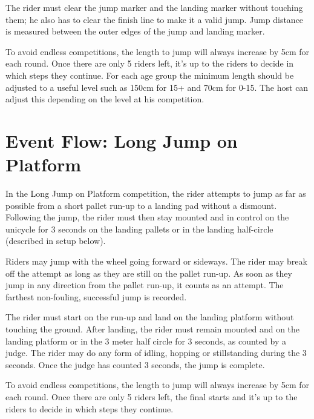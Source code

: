 The rider must clear the jump marker and the landing marker without touching them; he also has to clear the finish line to make it a valid jump.
Jump distance is measured between the outer edges of the jump and landing marker.

To avoid endless competitions, the length to jump will always increase by 5cm for each round.
Once there are only 5 riders left, it's up to the riders to decide in which steps they continue.
For each age group the minimum length should be adjusted to a useful level such as 150cm for 15+ and 70cm for 0-15.
The host can adjust this depending on the level at his competition.

\section{Event Flow: Long Jump on Platform}
In the Long Jump on Platform competition, the rider attempts to jump as far as possible from a short pallet run-up to a landing pad without a dismount.
Following the jump, the rider must then stay mounted and in control on the unicycle for 3 seconds on the landing pallets or in the landing half-circle (described in setup below).

Riders may jump with the wheel going forward or sideways.
The rider may break off the attempt as long as they are still on the pallet run-up.
As soon as they jump in any direction from the pallet run-up, it counts as an attempt.
The farthest non-fouling, successful jump is recorded.

The rider must start on the run-up and land on the landing platform without touching the ground.
After landing, the rider must remain mounted and on the landing platform or in the 3 meter half circle for 3 seconds, as counted by a judge.
The rider may do any form of idling, hopping or stillstanding during the 3 seconds.
Once the judge has counted 3 seconds, the jump is complete.

To avoid endless competitions, the length to jump will always increase by 5cm for each round.
Once there are only 5 riders left, the final starts and it’s up to the riders to decide in which steps they continue.

